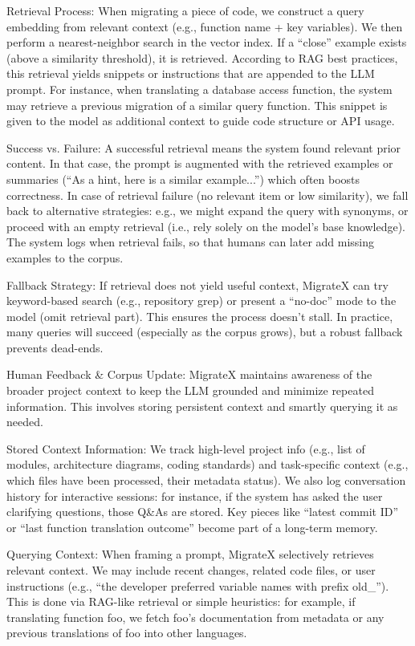 \documentclass[twocolumn]{article}
\begin{document}
    {Retrieval Process}: When migrating a piece of code, we construct a query embedding from relevant context (e.g., function name + key variables). We then perform a nearest-neighbor search in the vector index. If a “close” example exists (above a similarity threshold), it is retrieved. According to RAG best practices, this retrieval yields snippets or instructions that are appended to the LLM prompt. For instance, when translating a database access function, the system may retrieve a previous migration of a similar query function. This snippet is given to the model as additional context to guide code structure or API usage.

    {Success vs. Failure}: A successful retrieval means the system found relevant prior content. In that case, the prompt is augmented with the retrieved examples or summaries (``As a hint, here is a similar example...'') which often boosts correctness. In case of retrieval failure (no relevant item or low similarity), we fall back to alternative strategies: e.g., we might expand the query with synonyms, or proceed with an empty retrieval (i.e., rely solely on the model’s base knowledge). The system logs when retrieval fails, so that humans can later add missing examples to the corpus.

    {Fallback Strategy}: If retrieval does not yield useful context, MigrateX can try keyword-based search (e.g., repository grep) or present a ``no-doc'' mode to the model (omit retrieval part). This ensures the process doesn’t stall. In practice, many queries will succeed (especially as the corpus grows), but a robust fallback prevents dead-ends.

    {Human Feedback \& Corpus Update}: MigrateX maintains awareness of the broader project context to keep the LLM grounded and minimize repeated information. This involves storing persistent context and smartly querying it as needed.

    {Stored Context Information}: We track high-level project info (e.g., list of modules, architecture diagrams, coding standards) and task-specific context (e.g., which files have been processed, their metadata status). We also log conversation history for interactive sessions: for instance, if the system has asked the user clarifying questions, those Q\&As are stored. Key pieces like ``latest commit ID'' or ``last function translation outcome'' become part of a long-term memory.

    {Querying Context}: When framing a prompt, MigrateX selectively retrieves relevant context. We may include recent changes, related code files, or user instructions (e.g., ``the developer preferred variable names with prefix old\_''). This is done via RAG-like retrieval or simple heuristics: for example, if translating function foo, we fetch foo’s documentation from metadata or any previous translations of foo into other languages.
\end{document}
